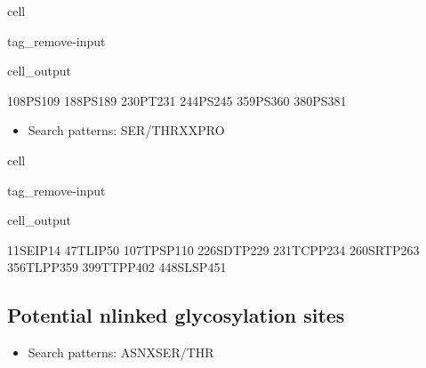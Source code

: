 \documentclass[letterpaper,10pt,english]{jupyterBook}
\begin{document}
\begin{sphinxuseclass}{cell}
\begin{sphinxuseclass}{tag_remove-input}\begin{sphinxVerbatimOutput}

\begin{sphinxuseclass}{cell_output}
\begin{sphinxVerbatim}[commandchars=\\\{\}]
108\PYGZhy{}PS\PYGZhy{}109
188\PYGZhy{}PS\PYGZhy{}189
230\PYGZhy{}PT\PYGZhy{}231
244\PYGZhy{}PS\PYGZhy{}245
359\PYGZhy{}PS\PYGZhy{}360
380\PYGZhy{}PS\PYGZhy{}381
\end{sphinxVerbatim}

\end{sphinxuseclass}\end{sphinxVerbatimOutput}

\end{sphinxuseclass}
\end{sphinxuseclass}\begin{itemize}
\item {} 
\sphinxAtStartPar
Search patterns: SER/THR\sphinxhyphen{}X\sphinxhyphen{}X\sphinxhyphen{}PRO

\end{itemize}

\begin{sphinxuseclass}{cell}
\begin{sphinxuseclass}{tag_remove-input}\begin{sphinxVerbatimOutput}

\begin{sphinxuseclass}{cell_output}
\begin{sphinxVerbatim}[commandchars=\\\{\}]
11\PYGZhy{}SEIP\PYGZhy{}14
47\PYGZhy{}TLIP\PYGZhy{}50
107\PYGZhy{}TPSP\PYGZhy{}110
226\PYGZhy{}SDTP\PYGZhy{}229
231\PYGZhy{}TCPP\PYGZhy{}234
260\PYGZhy{}SRTP\PYGZhy{}263
356\PYGZhy{}TLPP\PYGZhy{}359
399\PYGZhy{}TTPP\PYGZhy{}402
448\PYGZhy{}SLSP\PYGZhy{}451
\end{sphinxVerbatim}

\end{sphinxuseclass}\end{sphinxVerbatimOutput}

\end{sphinxuseclass}
\end{sphinxuseclass}

\subsection{Potential n\sphinxhyphen{}linked glycosylation sites}
\label{\detokenize{ipynb/chapter1:potential-n-linked-glycosylation-sites}}\begin{itemize}
\item {} 
\sphinxAtStartPar
Search patterns: ASN\sphinxhyphen{}X\sphinxhyphen{}SER/THR

\end{itemize}
\end{document}
